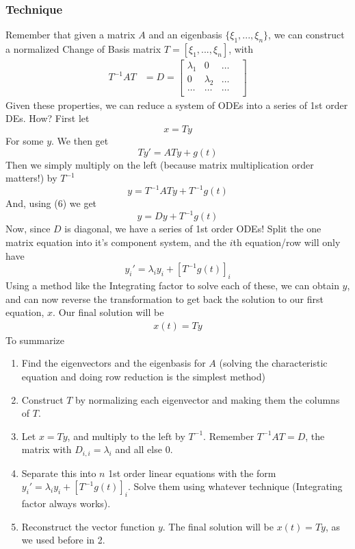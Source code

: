 \documentclass[11pt]{article}
\begin{document}
\subsubsection{Technique}
Remember that given a matrix $A$ and an eigenbasis $\{\xi_1, ..., \xi_n\}$, we can construct a
normalized Change of Basis matrix $T = \left[ \xi_1, ..., \xi_n \right]$, with 
\begin{align}
    T^{-1}AT &= D = \begin{bmatrix} 
                        \lambda_1 & 0 & \dots & \\
                        0 & \lambda_2 & \dots \\
                        \dots & \dots & \dots \\
                    \end{bmatrix} 
\end{align}
Given these properties, we can reduce a system of ODEs into a series of 1st order DEs. How? First
let 
    \[ x = Ty \] 
For some $y$. We then get
    \[ Ty' = ATy + g(t) \]
Then we simply multiply on the left (because matrix multiplication order matters!) by $T^{-1}$
    \[ y = T^{-1}ATy + T^{-1}g(t) \]
And, using (6) we get
    \[ y = Dy + T^{-1}g(t) \]
Now, since $D$ is diagonal, we have a series of 1st order ODEs! Split the one matrix equation into
it's component system, and the $i$th equation/row will only have 
    \[y_i' = \lambda_i y_i + \left[ T^{-1}g(t) \right]_i \]  
Using a method like the Integrating factor to solve each of these, we can obtain $y$, and can now reverse
the transformation to get back the solution to our first equation, $x$. Our final solution will be
\begin{align*}
    x(t) = Ty
\end{align*}
To summarize
\begin{enumerate}
    \item Find the eigenvectors and the eigenbasis for $A$ (solving the characteristic equation and doing 
          row reduction is the simplest method)
    \item Construct $T$ by normalizing each eigenvector and making them the columns of $T$.
    \item Let $x = Ty$, and multiply to the left by $T^{-1}$. Remember $T^{-1}AT = D$, the matrix
          with $D_{i,i} = \lambda_i$ and all else $0$. 
    \item Separate this into $n$ 1st order linear equations with the form 
            $y_i' = \lambda_i y_i + \left[ T^{-1}g(t) \right]_i $. Solve them using whatever technique (Integrating
          factor always works).
    \item Reconstruct the vector function $y$. The final solution will be $x(t) = Ty$, as we used before
          in 2.
\end{enumerate}
\end{document}
